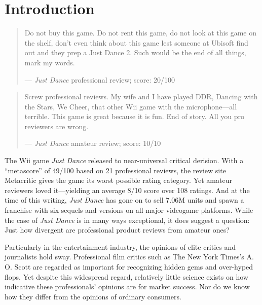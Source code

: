 \documentclass{sig-alternate}
\begin{document}
\section{Introduction}
\begin{quote}
\small
Do not buy this game. Do not rent this game, do not look at this game on the shelf, don't even think about this game lest someone at Ubisoft find out and they prep a Just Dance 2. Such would be the end of all things, mark my words.

--- \textit{Just Dance} professional review; score: 20/100 %
\end{quote}

\begin{quote}
\small
Screw professional reviews. My wife and I have played DDR, Dancing with
the Stars, We Cheer, that other Wii game with the microphone---all terrible. This game is great because it is fun. End of story. All you pro reviewers are wrong.

--- \textit{Just Dance} amateur review; score: 10/10
\end{quote}

The Wii game \textit{Just Dance} released to near-universal
critical derision. With a ``metascore'' of 49/100 based on 21
professional reviews, the review site Metacritic gives the game its worst
possible rating category. Yet amateur reviewers loved it---yielding an average 8/10 score over 108 ratings. 
And at the time of this writing, \textit{Just Dance} has gone on to sell 7.06M units and spawn a franchise with six sequels and versions on all major videogame platforms. 
While the case of \textit{Just Dance} is in many ways exceptional, it does suggest a question: Just how divergent are professional product reviews from amateur ones?

Particularly in the entertainment industry, the opinions of elite
critics and journalists hold sway. Professional film critics
such as The New York Times's A. O. Scott are regarded as important
for recognizing hidden gems and over-hyped flops. Yet despite this
widespread regard, relatively little science exists on how indicative
these professionals' opinions are for market success. Nor do we know 
how they differ from the opinions of ordinary consumers.
\end{document}
